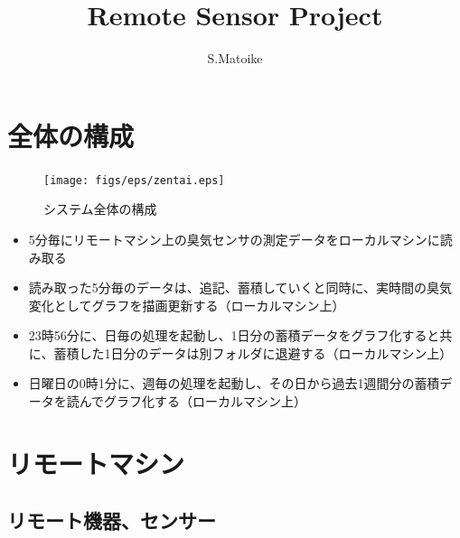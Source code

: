 \documentclass[12pt,a4paper,uplatex]{jsarticle}
\title{Remote Sensor Project}
\author{S.Matoike}
\begin{document}
\maketitle

\newpage

\tableofcontents


\newpage

\section{全体の構成}

\begin{figure}[H]
	\begin{minipage}[b]{1.0\linewidth}
		\centering
		\texttt{[image: figs/eps/zentai.eps]}
		\caption{システム全体の構成}
	\end{minipage}
\end{figure}

\begin{itemize}
	\item 5分毎にリモートマシン上の臭気センサの測定データをローカルマシンに読み取る
	\item 読み取った5分毎のデータは、追記、蓄積していくと同時に、実時間の臭気変化としてグラフを描画更新する（ローカルマシン上）
	\item 23時56分に、日毎の処理を起動し、1日分の蓄積データをグラフ化すると共に、蓄積した1日分のデータは別フォルダに退避する（ローカルマシン上）
	\item 日曜日の0時1分に、週毎の処理を起動し、その日から過去1週間分の蓄積データを読んでグラフ化する（ローカルマシン上）
\end{itemize}

\section{リモートマシン}

\subsection{リモート機器、センサー}
\end{document}
